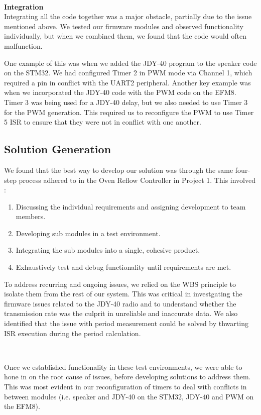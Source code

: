 \documentclass{article}
\begin{document}
\

\textbf{Integration} \\
Integrating all the code together was a major obstacle, partially due to the issue mentioned above. We tested our firmware modules and observed functionality
individually, but when we combined them, we found that the code would often malfunction.

One example of this was when we added the JDY-40 program to the speaker code on the STM32. We had configured Timer 2 in PWM mode via Channel 1, which
required a pin in conflict with the UART2 peripheral. Another key example was when we incorporated the JDY-40 code with the PWM code
on the EFM8. Timer 3 was being used for a JDY-40 delay, but we also needed to use Timer 3 for the PWM generation. This required us to
reconfigure the PWM to use Timer 5 ISR to ensure that they were not in conflict with one another.

\subsection{Solution Generation}

We found that the best way to develop our solution was through the same four-step process adhered to in the Oven Reflow Controller in Project 1.
This involved :

\begin{enumerate}
  \item Discussing the individual requirements and assigning development to team members.
  \item Developing sub modules in a test environment.
  \item Integrating the sub modules into a single, cohesive product.
  \item Exhaustively test and debug functionality until requirements are met.
\end{enumerate}

To address recurring and ongoing issues, we relied on the WBS principle to isolate them from the rest of our system.
This was critical in investgating the firmware issues related to the JDY-40 radio and to understand whether the transmission rate was the culprit
in unreliable and inaccurate data. We also identified that the issue with period measurement could be solved by thwarting ISR execution during the period calculation.

\

Once we established functionality in these test environments, we were able to hone in on the root cause of issues, before developing solutions to address them. This was most evident
in our reconfiguration of timers to deal with conflicts in between modules (i.e. speaker and JDY-40 on the STM32, JDY-40 and PWM on the EFM8).
\end{document}
